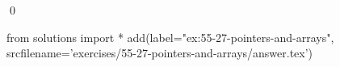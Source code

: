 
\begin{ex}
  \label{ex:55-27-pointers-and-arrays}
  
  \qed
\end{ex}
\begin{python0}
from solutions import *
add(label="ex:55-27-pointers-and-arrays",
    srcfilename='exercises/55-27-pointers-and-arrays/answer.tex')
\end{python0}
